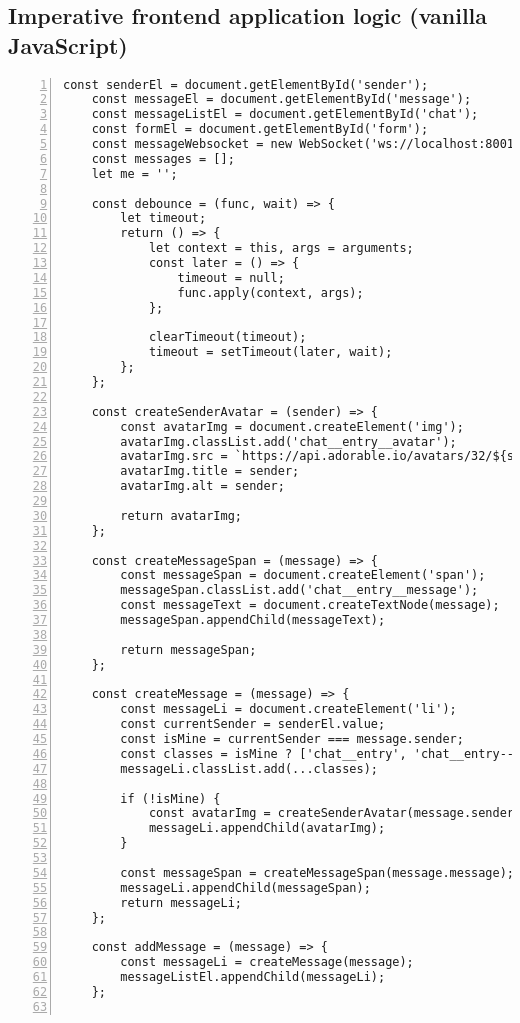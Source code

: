 \begin{appendices}
	\chapter{Imperative frontend application logic (vanilla JavaScript)}
	\label{appendix:vanilla}
	
	\begin{lstlisting}[numbers=left]
	const senderEl = document.getElementById('sender');
	const messageEl = document.getElementById('message');
	const messageListEl = document.getElementById('chat');
	const formEl = document.getElementById('form');
	const messageWebsocket = new WebSocket('ws://localhost:8001');
	const messages = [];
	let me = '';
	
	const debounce = (func, wait) => {
		let timeout;
		return () => {
			let context = this, args = arguments;
			const later = () => {
				timeout = null;
				func.apply(context, args);
			};
		
			clearTimeout(timeout);
			timeout = setTimeout(later, wait);
		};
	};
	
	const createSenderAvatar = (sender) => {
		const avatarImg = document.createElement('img');
		avatarImg.classList.add('chat__entry__avatar');
		avatarImg.src = `https://api.adorable.io/avatars/32/${sender}.svg`;
		avatarImg.title = sender;
		avatarImg.alt = sender;
		
		return avatarImg;
	};
	
	const createMessageSpan = (message) => {
		const messageSpan = document.createElement('span');
		messageSpan.classList.add('chat__entry__message');
		const messageText = document.createTextNode(message);
		messageSpan.appendChild(messageText);
		
		return messageSpan;
	};
	
	const createMessage = (message) => {
		const messageLi = document.createElement('li');
		const currentSender = senderEl.value;
		const isMine = currentSender === message.sender;
		const classes = isMine ? ['chat__entry', 'chat__entry--mine'] : ['chat__entry'];
		messageLi.classList.add(...classes);
		
		if (!isMine) {
			const avatarImg = createSenderAvatar(message.sender);
			messageLi.appendChild(avatarImg);
		}
		
		const messageSpan = createMessageSpan(message.message);
		messageLi.appendChild(messageSpan);
		return messageLi;
	};
		
	const addMessage = (message) => {
		const messageLi = createMessage(message);
		messageListEl.appendChild(messageLi);
	};
	

\end{lstlisting}
\end{appendices}
